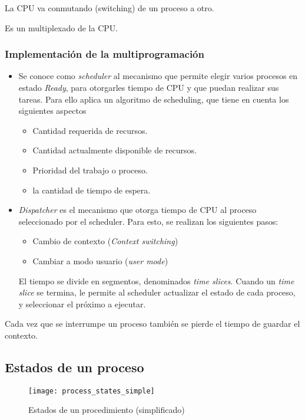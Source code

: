\documentclass[a4paper, twoside]{article}
\begin{document}
La CPU va conmutando (switching) de un proceso a otro.

Es un multiplexado de la CPU.

\subsubsection{Implementación de la multiprogramación}

\begin{itemize}
  \item Se conoce como \emph{scheduler} al mecanismo que permite elegir varios
  procesos en estado \emph{Ready}, para otorgarles tiempo de CPU y que puedan
  realizar sus tareas. Para ello aplica un algoritmo de scheduling, que tiene
  en cuenta los siguientes aspectos
  \begin{itemize}
    \item Cantidad requerida de recursos.
    \item Cantidad actualmente disponible de recursos.
    \item Prioridad del trabajo o proceso.
    \item la cantidad de tiempo de espera.
  \end{itemize}

  \item \emph{Dispatcher} es el mecanismo que otorga tiempo de CPU al proceso
  seleccionado por el scheduler. Para esto, se realizan los siguientes pasos:
  \begin{itemize}
    \item Cambio de contexto (\emph{Context switching})
    \item Cambiar a modo usuario (\emph{user mode})
  \end{itemize}
  El tiempo se divide en segmentos, denominados \emph{time slices}.
  Cuando un \emph{time slice} se termina, le permite al scheduler actualizar
  el estado de cada proceso, y seleccionar el próximo a ejecutar.
\end{itemize}

Cada vez que se interrumpe un proceso también se pierde el tiempo de guardar
el contexto.

\subsection{Estados de un proceso}

\begin{figure}[H]
  \centering
  \texttt{[image: process\_states\_simple]}
  \caption{Estados de un procedimiento (simplificado)}
  \label{fig:process_states_simple}
\end{figure}
\end{document}
